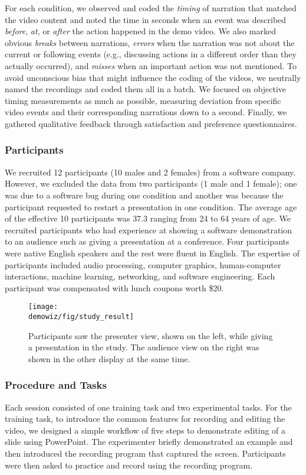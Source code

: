 For each condition, we observed and coded the \textit{timing} of narration that matched the video content and noted the time in seconds when an event was described \textit{before}, \textit{at}, or \textit{after} the action happened in the demo video. We also marked obvious \textit{breaks} between narrations, \textit{errors} when the narration was not about the current or following events (e.g., discussing actions in a different order than they actually occurred), and \textit{misses} when an important action was not mentioned. To avoid unconscious bias that might influence the coding of the videos, we neutrally named the recordings and coded them all in a batch. We focused on objective timing measurements as much as possible, measuring deviation from specific video events and their corresponding narrations down to a second. Finally, we gathered qualitative feedback through satisfaction and preference questionnaires.

\subsubsection{Participants}
We recruited 12 participants (10 males and 2 females) from a software company. However, we excluded the data from two participants (1 male and 1 female); one was due to a software bug during one condition and another was because the participant requested to restart a presentation in one condition. The average age of the effective 10 participants was 37.3 ranging from 24 to 64 years of age. We recruited participants who had experience at showing a software demonstration to an audience such as giving a presentation at a conference. Four participants were native English speakers and the rest were fluent in English. The expertise of participants included audio processing, computer graphics, human-computer interactions, machine learning, networking, and software engineering. Each participant was compensated with lunch coupons worth \$20.

\begin{figure}[t!]
  \centering
  \texttt{[image: \\demowiz/fig/study\_result]}
  \caption{Participants saw the presenter view, shown on the left, while giving a presentation in the study. The audience view on the right was shown in the other display at the same time.}
  \label{fig:demowiz_results_two_views}
\end{figure}

\subsubsection{Procedure and Tasks} Each session consisted of one training task and two experimental tasks. For the training task, to introduce the common features for recording and editing the video, we designed a simple workflow of five steps to demonstrate editing of a slide using PowerPoint. The experimenter briefly demonstrated an example and then introduced the recording program that captured the screen. Participants were then asked to practice and record using the recording program.

